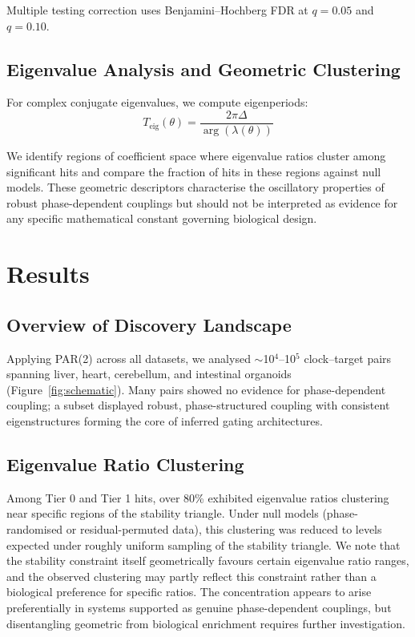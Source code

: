 \documentclass[11pt,letterpaper]{article}
\begin{document}
Multiple testing correction uses Benjamini--Hochberg FDR at $q = 0.05$ and $q = 0.10$.

\subsection{Eigenvalue Analysis and Geometric Clustering}

For complex conjugate eigenvalues, we compute eigenperiods:
\begin{equation}
T_{\text{eig}}(\theta) = \frac{2\pi \Delta}{\arg(\lambda(\theta))}
\end{equation}

We identify regions of coefficient space where eigenvalue ratios cluster among significant hits and compare the fraction of hits in these regions against null models. These geometric descriptors characterise the oscillatory properties of robust phase-dependent couplings but should not be interpreted as evidence for any specific mathematical constant governing biological design.

\section{Results}

\subsection{Overview of Discovery Landscape}

Applying PAR(2) across all datasets, we analysed $\sim$10$^4$--10$^5$ clock--target pairs spanning liver, heart, cerebellum, and intestinal organoids (Figure~\ref{fig:schematic}). Many pairs showed no evidence for phase-dependent coupling; a subset displayed robust, phase-structured coupling with consistent eigenstructures forming the core of inferred gating architectures.

\subsection{Eigenvalue Ratio Clustering}

Among Tier 0 and Tier 1 hits, over 80\% exhibited eigenvalue ratios clustering near specific regions of the stability triangle. Under null models (phase-randomised or residual-permuted data), this clustering was reduced to levels expected under roughly uniform sampling of the stability triangle. We note that the stability constraint itself geometrically favours certain eigenvalue ratio ranges, and the observed clustering may partly reflect this constraint rather than a biological preference for specific ratios. The concentration appears to arise preferentially in systems supported as genuine phase-dependent couplings, but disentangling geometric from biological enrichment requires further investigation.
\end{document}
